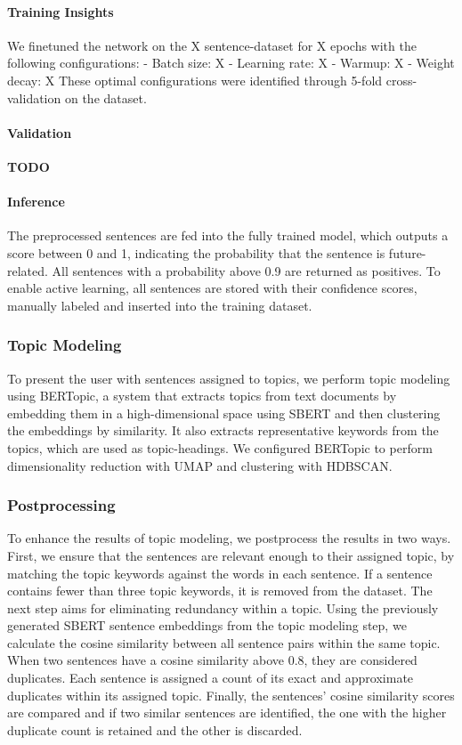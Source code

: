 \documentclass[sigconf]{acmart}
\begin{document}
\paragraph{Training Insights}
We finetuned the network on the X sentence-dataset for X epochs with the following configurations:
  - Batch size: X
  - Learning rate: X
  - Warmup: X
  - Weight decay: X
These optimal configurations were identified through 5-fold cross-validation on the dataset.

\paragraph{Validation}
\textbf{TODO}

\paragraph{Inference}
The preprocessed sentences are fed into the fully trained model, which outputs a score between 0 and 1, indicating the probability that the sentence is future-related. All sentences with a probability above 0.9 are returned as positives. To enable active learning, all sentences are stored with their confidence scores, manually labeled and inserted into the training dataset.

\subsubsection{Topic Modeling}
To present the user with sentences assigned to topics, we perform topic modeling using BERTopic, a system that extracts topics from text documents by embedding them in a high-dimensional space using SBERT and then clustering the embeddings by similarity.
It also extracts representative keywords from the topics, which are used as topic-headings. We configured BERTopic to perform dimensionality reduction with UMAP and clustering with HDBSCAN.

\subsubsection{Postprocessing}

To enhance the results of topic modeling, we postprocess the results in two ways.
First, we ensure that the sentences are relevant enough to their assigned topic, by matching the topic keywords against the words in each sentence. If a sentence contains fewer than three topic keywords, it is removed from the dataset.
The next step aims for eliminating redundancy within a topic. Using the previously generated SBERT sentence embeddings from the topic modeling step, we calculate the cosine similarity between all sentence pairs within the same topic. When two sentences have a cosine similarity above 0.8, they are considered duplicates. Each sentence is assigned a count of its exact and approximate duplicates within its assigned topic. Finally, the sentences' cosine similarity scores are compared and if two similar sentences are identified, the one with the higher duplicate count is retained and the other is discarded.
\end{document}
